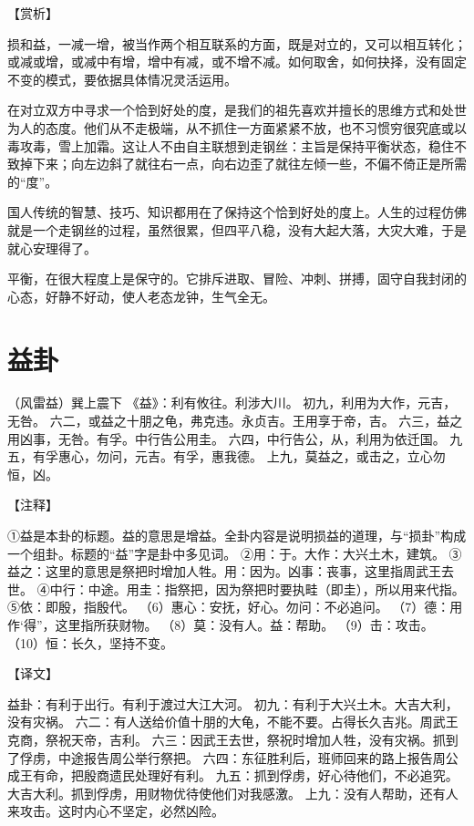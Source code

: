 \documentclass[12pt,UTF8]{ctexbook}
\begin{document}
【赏析】

损和益，一减一增，被当作两个相互联系的方面，既是对立的，又可以相互转化；或减或增，或减中有增，增中有减，或不增不减。如何取舍，如何抉择，没有固定不变的模式，要依据具体情况灵活运用。

在对立双方中寻求一个恰到好处的度，是我们的祖先喜欢并擅长的思维方式和处世为人的态度。他们从不走极端，从不抓住一方面紧紧不放，也不习惯穷很究底或以毒攻毒，雪上加霜。这让人不由自主联想到走钢丝：主旨是保持平衡状态，稳住不致掉下来；向左边斜了就往右一点，向右边歪了就往左倾一些，不偏不倚正是所需的“度”。

国人传统的智慧、技巧、知识都用在了保持这个恰到好处的度上。人生的过程仿佛就是一个走钢丝的过程，虽然很累，但四平八稳，没有大起大落，大灾大难，于是就心安理得了。

平衡，在很大程度上是保守的。它排斥进取、冒险、冲刺、拼搏，固守自我封闭的心态，好静不好动，使人老态龙钟，生气全无。

\chapter{益卦}

（风雷益）巽上震下
《益》：利有攸往。利涉大川。
初九，利用为大作，元吉，无咎。
六二，或益之十朋之龟，弗克违。永贞吉。王用享于帝，吉。
六三，益之用凶事，无咎。有孚。中行告公用圭。
六四，中行告公，从，利用为依迁国。
九五，有孚惠心，勿问，元吉。有孚，惠我德。
上九，莫益之，或击之，立心勿恒，凶。

【注释】

①益是本卦的标题。益的意思是增益。全卦内容是说明损益的道理，与“损卦”构成一个组卦。标题的“益”字是卦中多见词。
②用：于。大作：大兴土木，建筑。
③益之：这里的意思是祭把时增加人牲。用：因为。凶事：丧事，这里指周武王去世。
④中行：中途。用圭：指祭把，因为祭把时要执畦（即圭），所以用来代指。
⑤依：即殷，指殷代。
（6）惠心：安抚，好心。勿问：不必追问。
（7）德：用作‘得”，这里指所获财物。
（8）莫：没有人。益：帮助。
（9）击：攻击。
（10）恒：长久，坚持不变。

【译文】

益卦：有利于出行。有利于渡过大江大河。
初九：有利于大兴土木。大吉大利，没有灾祸。
六二：有人送给价值十朋的大龟，不能不要。占得长久吉兆。周武王克商，祭祝天帝，吉利。
六三：因武王去世，祭祝时增加人牲，没有灾祸。抓到了俘虏，中途报告周公举行祭把。
六四：东征胜利后，班师回来的路上报告周公成王有命，把殷商遗民处理好有利。
九五：抓到俘虏，好心待他们，不必追究。大吉大利。抓到俘虏，用财物优待使他们对我感激。
上九：没有人帮助，还有人来攻击。这时内心不坚定，必然凶险。
\end{document}
